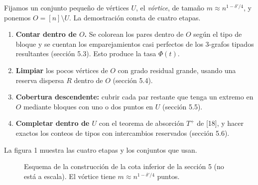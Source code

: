 \documentclass[spanish,11pt,a4paper]{article}
\providecommand{\tightlist}{\setlength{\itemsep}{0pt}\setlength{\parskip}{0pt}}
\begin{document}
Fijamos un conjunto pequeño de vértices \(U\), el \emph{vórtice}, de tamaño \(m\approx n^{1-\delta'/4}\), y ponemos \(O=[n]\setminus U\). La demostración consta de cuatro etapas.

\begin{enumerate}
\def\labelenumi{\arabic{enumi}.}
\tightlist
\item
  \textbf{Contar dentro de \(O\).} Se colorean los pares dentro de \(O\) según el tipo de bloque y se cuentan los emparejamientos casi perfectos de los 3-grafos tipados resultantes (sección 5.3). Esto produce la tasa \(\Phi(t)\).
\item
  \textbf{Limpiar} los pocos vértices de \(O\) con grado residual grande, usando una reserva dispersa \(R\) dentro de \(O\) (sección 5.4).
\item
  \textbf{Cobertura descendente:} cubrir cada par restante que tenga un extremo en \(O\) mediante bloques con uno o dos puntos en \(U\) (sección 5.5).
\item
  \textbf{Completar dentro de \(U\)} con el teorema de absorción \(T^+\) de {[}18{]}, y hacer exactos los conteos de tipos con intercambios reservados (sección 5.6).
\end{enumerate}

La figura 1 muestra las cuatro etapas y los conjuntos que usan.

\begin{figure}[htbp]
\centering
{}
\caption{Esquema de la construcción de la cota inferior de la sección 5 (no está a escala). El vórtice tiene $m\approx n^{1-\delta'/4}$ puntos.}
\end{figure}
\end{document}
